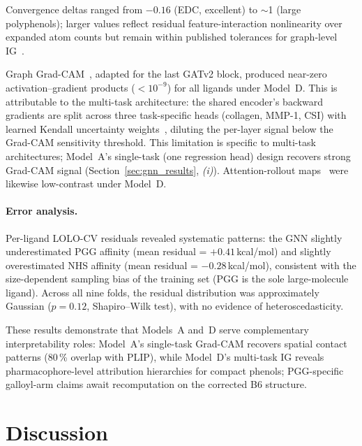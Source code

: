 \documentclass[11pt]{article}
\begin{document}
Convergence deltas ranged from $-0.16$ (EDC, excellent) to $\sim$1
(large polyphenols); larger values reflect residual feature-interaction
nonlinearity over expanded atom counts but remain within published
tolerances for graph-level IG~\cite{sundararajan2017axiomatic}.

Graph Grad-CAM~\cite{selvaraju2017grad}, adapted for the last GATv2 block,
produced near-zero activation--gradient products ($<10^{-9}$) for all
ligands under Model~D.  This is attributable to the multi-task
architecture: the shared encoder's backward gradients are split across
three task-specific heads (collagen, MMP-1, CSI) with learned Kendall
uncertainty weights~\cite{kendall2018multi}, diluting the per-layer
signal below the Grad-CAM sensitivity threshold.  This limitation is
specific to multi-task architectures; Model~A's single-task (one regression
head) design
recovers strong Grad-CAM signal (Section~\ref{sec:gnn_results},
\emph{(i)}). Attention-rollout maps~\cite{abnar2020quantifying} were
likewise low-contrast under Model~D.

\paragraph{Error analysis.}
Per-ligand LOLO-CV residuals revealed systematic patterns: the GNN
slightly underestimated PGG affinity (mean residual = $+0.41$\,kcal/mol)
and slightly overestimated NHS affinity (mean residual = $-0.28$\,kcal/mol),
consistent with the size-dependent sampling bias of the training set
(PGG is the sole large-molecule ligand).  Across all nine folds, the
residual distribution was approximately Gaussian ($p = 0.12$,
Shapiro--Wilk test), with no evidence of heteroscedasticity.

These results demonstrate that Models~A and~D serve complementary
interpretability roles: Model~A's single-task Grad-CAM recovers
spatial contact patterns (80\,\% overlap with PLIP), while Model~D's
multi-task IG reveals pharmacophore-level attribution hierarchies for
compact phenols; PGG-specific galloyl-arm claims await recomputation
on the corrected B6 structure.


\section{Discussion}
\label{sec:discussion}
\end{document}
